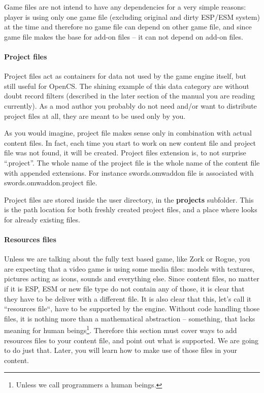 Game files are not intend to have any dependencies for a very simple reasons: player is using only one game file (excluding original
and dirty {ESP/ESM} system) at the time and therefore no game file can depend on other game file, and since game file makes the base
for add-on files -- it can not depend on add-on files.

\paragraph{Project files}
Project files act as containers for data not used by the \OMW{} game engine itself, but still useful for OpenCS. The shining example
of this data category are without doubt record filters (described in the later section of the manual you are reading currently).
As a mod author you probably do not need and/or want to distribute project files at all, they are meant to be used only by you.

As you would imagine, project file makes sense only in combination with actual content files. In fact, each time you start to work on new content file and project file was not found, it will be created. Project files extension is, to not surprise ``.project''. The whole name of the project file is the whole name of the content file with appended extensions. For instance swords.omwaddon file is associated with swords.omwaddon.project file.

Project files are stored inside the user directory, in the \textbf{projects} subfolder. This is the path location for both freshly created project files, and a place where \OCS{} looks for already existing files.

\paragraph{Resources files}
Unless we are talking about the fully text based game, like Zork or Rogue, you are expecting that a video game is using some media files:
models with textures, pictures acting as icons, sounds and everything else. Since content files, no matter if it is ESP, ESM or new \OMW{}
file type do not contain any of those, it is clear that they have to be deliver with a different file. It is also clear that this,
let's call it ``resources file``, have to be supported by the engine. Without code handling those files, it is nothing more than
a mathematical abstraction -- something, that lacks meaning for human beings\footnote{Unless we call programmers a human beings.}.
Therefore this section must cover ways to add resources files to your content file, and point out what is supported. We are going
to do just that. Later, you will learn how to make use of those files in your content.


